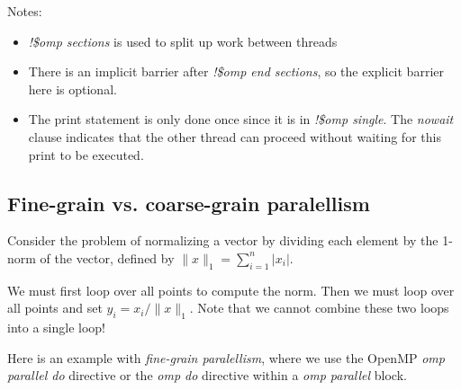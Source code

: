 \documentclass[letterpaper,10pt,english]{sphinxmanual}
\begin{document}
Notes:
\begin{itemize}
\item {} 
\emph{!\$omp sections} is used to split up work between threads

\item {} 
There is an implicit barrier after \emph{!\$omp end sections}, so the
explicit barrier here is optional.

\item {} 
The print statement is only done once since it is in \emph{!\$omp single}.
The \emph{nowait} clause indicates that the other thread can proceed without
waiting for this print to be executed.

\end{itemize}


\subsection{Fine-grain vs. coarse-grain paralellism}
\label{openmp:fine-grain-vs-coarse-grain-paralellism}
Consider the problem of normalizing a vector by dividing each element by the
1-norm of the vector, defined by $\|x\|_1 = \sum_{i=1}^n |x_i|$.

We must first loop over all points to compute the norm.  Then we must loop
over all points and set $y_i = x_i / \|x\|_1$.  Note that we cannot
combine these two loops into a single loop!

Here is an example with \emph{fine-grain paralellism}, where we use the OpenMP
\emph{omp parallel do} directive or the \emph{omp do} directive within a \emph{omp
parallel} block.
\end{document}
